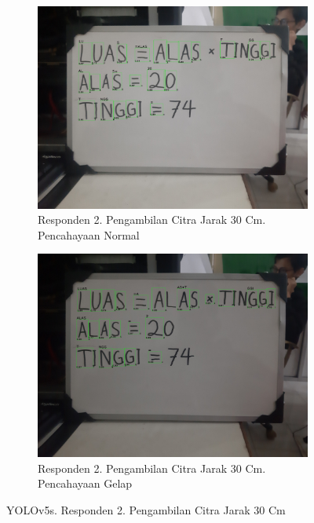 \begin{figure}[H]
  \begin{subfigure}{.5\textwidth}
    \centering
    \captionsetup{width=.8\linewidth}
    \includegraphics[width=.8\linewidth]{gambar/yolov5s/responden2/ghiyas30cm00-result.jpg}
    \caption{Responden 2. Pengambilan Citra Jarak 30 Cm. Pencahayaan Normal}
    \label{fig:sr2tcitra30cm}
  \end{subfigure}%
  \begin{subfigure}{.5\textwidth}
    \centering
    \captionsetup{width=.8\linewidth}
    \includegraphics[width=.8\linewidth]{gambar/yolov5s/responden2/ghiyas30cm10-result.jpg}
    \caption{Responden 2. Pengambilan Citra Jarak 30 Cm. Pencahayaan Gelap}
    \label{fig:sr2gcitra30cm}
  \end{subfigure}
  \caption{YOLOv5s. Responden 2. Pengambilan Citra Jarak 30 Cm}
  \label{fig:sr2citra30cm}
\end{figure}

